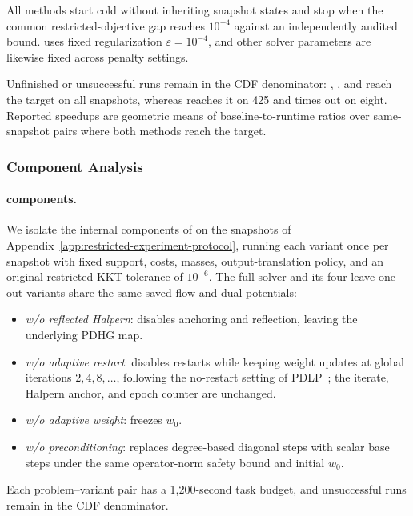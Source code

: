 All methods start cold without inheriting snapshot states and stop when the common restricted-objective gap reaches $10^{-4}$ against an independently audited bound.
\sinkhorn uses fixed regularization $\varepsilon=10^{-4}$, and other solver parameters are likewise fixed across penalty settings.

Unfinished or unsuccessful runs remain in the CDF denominator: \subsolver, \pdcs, and \sinkhorn reach the target on all snapshots, whereas \mm reaches it on 425 and times out on eight.
Reported speedups are geometric means of baseline-to-\subsolver runtime ratios over same-snapshot pairs where both methods reach the target.

\subsubsection{Component Analysis}
\label{app:system-component-protocol}
\paragraph{\subsolver components.}
\label{app:pduot-component-ablation}
We isolate the internal components of \subsolver on the snapshots of Appendix~\ref{app:restricted-experiment-protocol}, running each variant once per snapshot with fixed support, costs, masses, output-translation policy, and an original restricted KKT tolerance of $10^{-6}$.
The full solver and its four leave-one-out variants share the same saved flow and dual potentials:
\begin{itemize}
\item \emph{w/o reflected Halpern}: disables anchoring and reflection, leaving the underlying PDHG map.
\item \emph{w/o adaptive restart}: disables restarts while keeping weight updates at global iterations $2,4,8,\ldots$, following the no-restart setting of PDLP~\citep[Appendix C.2]{applegate2021practical}; the iterate, Halpern anchor, and epoch counter are unchanged.
\item \emph{w/o adaptive weight}: freezes $w_0$.
\item \emph{w/o preconditioning}: replaces degree-based diagonal steps with scalar base steps under the same operator-norm safety bound and initial $w_0$.
\end{itemize}
Each problem--variant pair has a 1,200-second task budget, and unsuccessful runs remain in the CDF denominator.

